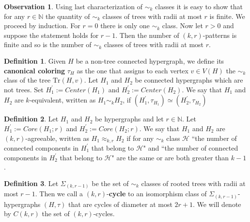 \documentclass[12pt,notitlepage,a4paper]{article}
\theoremstyle{definition}
\newtheorem{obs}{Observation}[section]
\newtheorem{definition}{Definition}[section]
\newcommand{\N}{\mathbb{N}}
\newcommand{\Tr}{\mathrm{Tr}}
\begin{document}
\begin{obs}\label{obs:finitetrees}
	Using last characterization of $\sim_k$ classes
	it is easy to show that for any $r\in \N$ the quantity
	of $\sim_k$ classes of trees with radii at most $r$ is finite. 
	We proceed by induction. For $r=0$ there is only one $\sim_k$ class.
	Now let $r>0$ and suppose the statement holds for $r-1$. Then
	the number of $(k,r)$-patterns is finite and so is the number
	of $\sim_k$ classes of trees with radii at most $r$. 
\end{obs}


\begin{definition}
	Given $H$ be a non-tree connected hypergraph, we define
	its \textbf{canonical coloring} $\tau_{H}$
	as the one that assigns to each vertex $v\in V(H)$ the $\sim_k$ 
	class of the tree
	$\Tr(H,v)$.
	Let $H_1$ and $H_2$ be connected hypergraphs which are not trees.
	Set $H^\prime_1:= Center(H_1)$ and $H^\prime_2:= Center(H_2)$.
	We say that $H_1$ and $H_2$ are $k$-equivalent,
	written as $H_1\sim_k H_2$, if
	$\left( H^\prime_1,\tau_{H_1}\right) \simeq 
	\left(H^\prime_2,\tau_{H_2}\right)$
\end{definition}

\begin{definition} \label{def:agreeability}
	Let $H_1$ and $H_2$ be hypergraphs and let $r\in \N$.
	Let $H^\prime_1:=Core(H_1;r)$ and $H^\prime_2:=Core(H_2;r)$. 
	We say that $H_1$ and $H_2$ are $(k,r)$-agreeable, written
	as $H_1\approx_{k,r} H_2$ if for any $\sim_k$ class $\mathcal{H}$ 
	``the number of connected
	components in $H^\prime_1$ that belong to $\mathcal{H}$" and
	``the number of connected components in $H^\prime_2$ that belong to 
	$\mathcal{H}$" are the same or are both greater than $k-1$.\par
	
\end{definition}


\begin{definition}
	Let $\Sigma_{(k,r-1)}$ be the set of $\sim_k$ classes
	of rooted trees with radii at most $r-1$. Then
	we call a $(k,r)$-\textbf{cycle} to an isomorphism class
	of $\Sigma_{(k,r-1)}$-hypergraphs 
	$(H,\tau)$ that are cycles of diameter at most $2r+1$.
	We will denote by $C(k,r)$ the set of $(k,r)$-cycles.
\end{definition}
\end{document}
